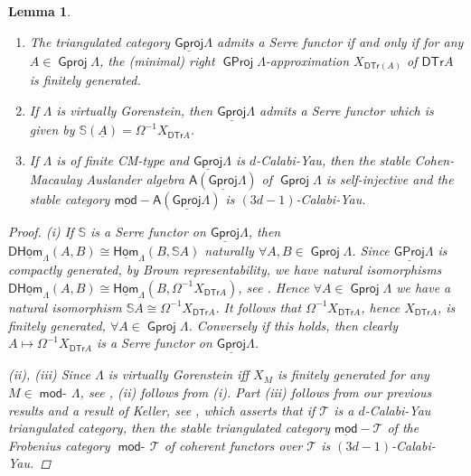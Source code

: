 \documentclass[oneside, a4paper,reqno]{amsart}
\numberwithin{equation}{section}
\newtheorem{lem}[thm]{Lemma}
\theoremstyle{definition}
\begin{document}
\begin{lem}
\begin{enumerate}
\item The triangulated category ${\operatorname{\underline{\mathsf{Gproj}}}\nolimits}\Lambda$ admits a Serre functor
if and only if  for any $A \in {\operatorname{\mathsf{Gproj}}\nolimits}\Lambda$, the (minimal) right
${\operatorname{\mathsf{GProj}}\nolimits}\Lambda$-approximation $X_{\mathsf{DTr}(A)}$ of
$\mathsf{DTr}A$ is finitely generated.
\item If $\Lambda$ is virtually
Gorenstein, then ${\operatorname{\underline{\mathsf{Gproj}}}\nolimits}\Lambda$ admits a Serre functor which is given by
$\mathbb S({\underline A}) = \Omega^{-1}X_{\mathsf{DTr}A}$.
\item If $\Lambda$ is of finite CM-type and
${\operatorname{\underline{\mathsf{Gproj}}}\nolimits}\Lambda$ is $d$-Calabi-Yau, then the stable Cohen-Macaulay
Auslander algebra $\mathsf{A}({\operatorname{\underline{\mathsf{Gproj}}}\nolimits}\Lambda)$ of ${\operatorname{\mathsf{Gproj}}\nolimits}\Lambda$ is
self-injective and the stable category
$\operatorname*{\underline{\mathsf{mod}}-\!}\mathsf{A}({\operatorname{\underline{\mathsf{Gproj}}}\nolimits}\Lambda)$ is $(3d-1)$-Calabi-Yau.
\end{enumerate}
\begin{proof} (i) If
$\mathbb S$ is a Serre functor on ${\operatorname{\underline{\mathsf{Gproj}}}\nolimits}\Lambda$, then
$\mathsf{D}\operatorname*{\underline{\mathsf{Hom}}}_{\Lambda}(A,B) \cong \operatorname*{\underline{\mathsf{Hom}}}_{\Lambda}(B,\mathbb S
A)$ naturally $\forall A, B \in {\operatorname{\mathsf{Gproj}}\nolimits}\Lambda$. Since
${\operatorname{\underline{\mathsf{GProj}}}\nolimits}\Lambda$ is compactly generated, by Brown representability,
we have natural isomorphisms $\mathsf{D}\operatorname*{\underline{\mathsf{Hom}}}_{\Lambda}(A,B) \cong
\operatorname*{\underline{\mathsf{Hom}}}_{\Lambda}(B,\Omega^{-1}X_{\mathsf{DTr}A})$, see
\cite[Proposition 8.8]{B:cm}. Hence $\forall A \in {\operatorname{\mathsf{Gproj}}\nolimits}\Lambda$ we
have a natural isomorphism $\mathbb S A \cong
\Omega^{-1}X_{\mathsf{DTr}A}$. It follows that
$\Omega^{-1}X_{\mathsf{DTr}A}$, hence $X_{\mathsf{DTr}A}$, is
finitely generated, $\forall A \in {\operatorname{\mathsf{Gproj}}\nolimits}\Lambda$. Conversely if
this holds, then clearly  $A \mapsto \Omega^{-1}X_{\mathsf{DTr}A}$
is a Serre functor on ${\operatorname{\underline{\mathsf{Gproj}}}\nolimits}\Lambda$.

(ii), (iii) Since  $\Lambda$ is virtually Gorenstein iff $X_{M}$ is
finitely generated for any $M \in \operatorname*{\mathsf{mod}-\!}\Lambda$, see \cite[Corollary
8.3]{B:cm}, (ii) follows from (i). Part (iii) follows from our
previous results and a result of Keller, see \cite[Lemma
8.5.2]{Keller:orbit}, which asserts that if ${\mathcal T}$ is a $d$-Calabi-Yau
triangulated category, then the stable triangulated category $\operatorname*{\underline{\mathsf{mod}}-\!}{\mathcal T}$ of the
Frobenius category $\operatorname*{\mathsf{mod}-\!}{\mathcal T}$ of coherent functors over ${\mathcal T}$ is
$(3d-1)$-Calabi-Yau.
\end{proof}
\end{lem}
\end{document}
